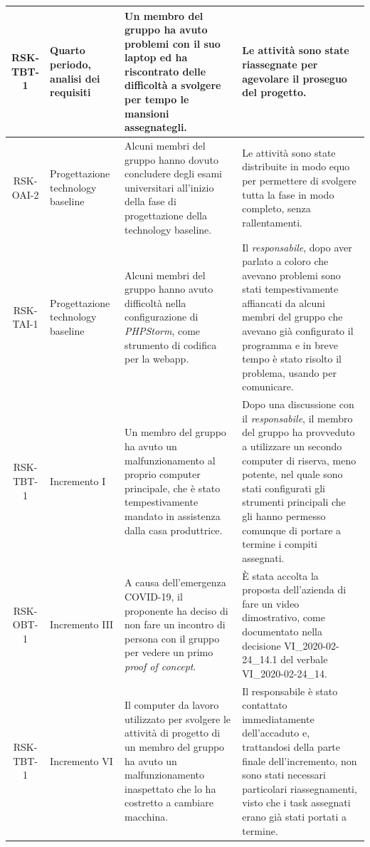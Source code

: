 \begin{center}
\begin{longtable}{|c|p{3cm}|p{4cm}|p{4cm}|}
			\hline
			RSK-TBT-1 & Quarto periodo, analisi dei requisiti & Un membro del gruppo ha avuto problemi con il suo laptop ed ha riscontrato delle difficoltà a svolgere per tempo le mansioni assegnategli. & Le attività sono state riassegnate per agevolare il proseguo del progetto. \\
			\hline
			RSK-OAI-2 & Progettazione technology baseline &Alcuni membri del gruppo hanno dovuto concludere degli esami universitari all'inizio della fase di progettazione della technology baseline. & Le attività sono state distribuite in modo equo per permettere di svolgere tutta la fase in modo completo, senza rallentamenti. \\
			\hline
			RSK-TAI-1 & Progettazione technology baseline &Alcuni membri del gruppo hanno avuto difficoltà nella configurazione di \textit{PHPStorm}, come strumento di codifica per la webapp. & Il \textit{responsabile}, dopo aver parlato a coloro che avevano problemi sono stati tempestivamente affiancati da alcuni membri del gruppo che avevano già configurato il programma e in breve tempo è stato risolto il problema, usando \glock{Discord} per comunicare. \\
			\hline
			RSK-TBT-1 & Incremento I & Un membro del gruppo ha avuto un malfunzionamento al proprio computer principale, che è stato tempestivamente mandato in assistenza dalla casa produttrice. & Dopo una discussione con il \textit{responsabile}, il membro del gruppo ha provveduto a utilizzare un secondo computer di riserva, meno potente, nel quale sono stati configurati gli strumenti principali che gli hanno permesso comunque di portare a termine i compiti assegnati. \\
			\hline
			RSK-OBT-1 & Incremento III & A causa dell'emergenza COVID-19, il proponente ha deciso di non fare un incontro di persona con il gruppo per vedere un primo \textit{proof of concept}. & È stata accolta la proposta dell'azienda di fare un video dimostrativo, come documentato nella decisione VI\_2020-02-24\_14.1 del verbale VI\_2020-02-24\_14. \\
			\hline
			RSK-TBT-1 & Incremento VI & Il computer da lavoro utilizzato per svolgere le attività di progetto di un membro del gruppo ha avuto un malfunzionamento inaspettato che lo ha costretto a cambiare macchina. & Il responsabile è stato contattato immediatamente dell'accaduto e, trattandosi della parte finale dell'incremento, non sono stati necessari particolari riassegnamenti, visto che i task assegnati erano già stati portati a termine. \\

\end{longtable}
\end{center}
